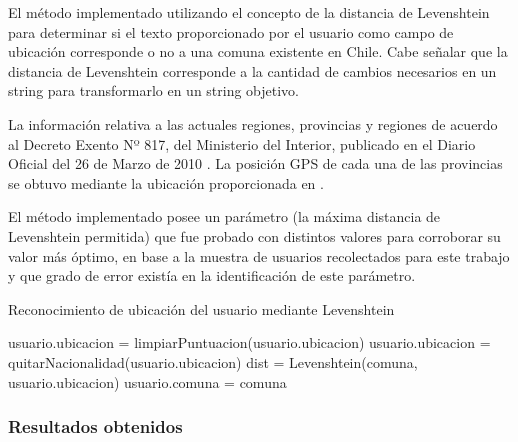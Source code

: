 El método implementado utilizando el concepto de la distancia de Levenshtein para determinar si el texto proporcionado por el usuario como campo de ubicación corresponde o no a una comuna existente en Chile. Cabe señalar que la distancia de Levenshtein corresponde a la cantidad de cambios necesarios en un string para transformarlo en un string objetivo.

La información relativa a las actuales regiones, provincias y regiones de acuerdo al Decreto Exento Nº 817, del Ministerio del Interior, publicado en el Diario Oficial del 26 de Marzo de 2010 \cite{listaCodigosProvincias}. La posición GPS de cada una de las provincias se obtuvo mediante la ubicación proporcionada en \cite{dicesmapas}.

El método implementado posee un parámetro (la máxima distancia de Levenshtein permitida) que fue probado con distintos valores para corroborar su valor más óptimo, en base a la muestra de usuarios recolectados para este trabajo y que grado de error existía en la identificación de este parámetro.

\begin{algorithm}
	\caption{Reconocimiento de ubicación del usuario mediante Levenshtein}\label{ciudadesLeven2}
	\begin{algorithmic}[1]
		\State usuario.ubicacion = limpiarPuntuacion(usuario.ubicacion)\;
		\State usuario.ubicacion = quitarNacionalidad(usuario.ubicacion)\;
		\State dist = Levenshtein(comuna, usuario.ubicacion)\;
		\State usuario.comuna = comuna\;
		\EndIf
		\EndFor
		\EndFor
		\EndFunction
	\end{algorithmic}
\end{algorithm}


\subsubsection{Resultados obtenidos}

